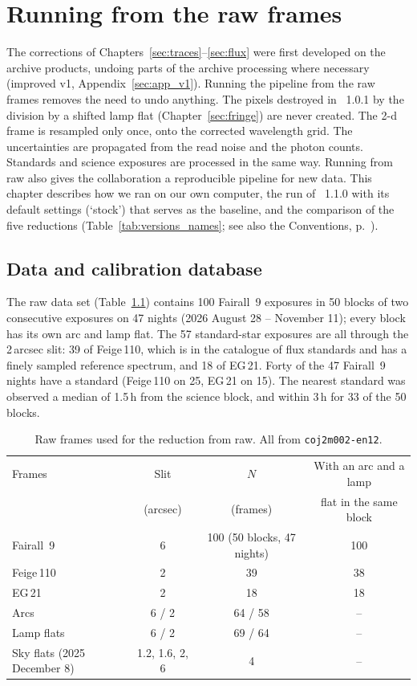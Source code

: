 \chapter{Running \banzai{} from the raw frames}
\label{sec:raw}

The corrections of Chapters~\ref{sec:traces}--\ref{sec:flux} were first developed on the archive products, undoing
parts of the archive processing where necessary (improved v1, Appendix~\ref{sec:app_v1}). Running the pipeline from the
raw frames removes the need to undo anything. The pixels destroyed in \banzai{}~1.0.1 by the division by a shifted
lamp flat (Chapter~\ref{sec:fringe}) are never created. The 2-d frame is resampled only once, onto the corrected
wavelength grid. The uncertainties are propagated from the read noise and the photon counts. Standards and science
exposures are processed in the same way. Running from raw also gives the collaboration a reproducible pipeline for
new data. This chapter describes how we ran \banzai{} on our own computer, the run of \banzai{}~1.1.0 with its
default settings (`stock') that serves as the baseline, and the comparison of the five reductions
(Table~\ref{tab:versions_names}; see also the Conventions, p.~\pageref{sec:conventions}).

\section{Data and calibration database}
\label{sec:raw_data}
The raw data set (Table~\ref{tab:rawdata}) contains 100 Fairall~9 exposures in 50 blocks of two consecutive
exposures on 47 nights (2026 August 28 -- November 11); every block has its own arc and lamp flat. The 57 standard-star
exposures are all through the 2\,arcsec slit: 39 of Feige\,110, which is in the \banzai{} catalogue of flux standards
and has a finely sampled reference spectrum, and 18 of EG\,21. Forty of the 47 Fairall~9 nights have a standard
(Feige\,110 on 25, EG\,21 on 15). The nearest standard was observed a median of 1.5\,h from the science block, and
within 3\,h for 33 of the 50 blocks.

\begin{table}[!htbp]
\centering
\caption{Raw frames used for the reduction from raw. All from \texttt{coj2m002-en12}.}
\label{tab:rawdata}
\begin{tabular}{lccc}
\toprule
Frames & Slit & $N$ & With an arc and a lamp \\
 & (arcsec) & (frames) & flat in the same block \\
\midrule
Fairall~9 & 6 & 100 (50 blocks, 47 nights) & 100 \\
Feige\,110 & 2 & 39 & 38 \\
EG\,21 & 2 & 18 & 18 \\
Arcs & 6 / 2 & 64 / 58 & -- \\
Lamp flats & 6 / 2 & 69 / 64 & -- \\
Sky flats (2025 December 8) & 1.2, 1.6, 2, 6 & 4 & -- \\
\bottomrule
\end{tabular}
\end{table}

